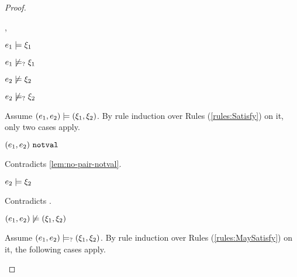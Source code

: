 \begin{proof}
\begin{byCases}
\begin{byCases}
\begin{byCases}
        \item[\csatisfy{e_1}{\xi_1},\cnotsatisfyormay{e_2}{\xi_2}]
            \begin{pfsteps*}
            \item $e_1 \models \xi_1$  
            \item $e_1 \not\models_{?} \xi_1$  
            \item $e_2 \not\models \xi_2$  
            \item $e_2 \not\models_{?} \xi_2$  
            \end{pfsteps*}
            Assume $(e_1 , e_2) \models (\xi_1 , \xi_2)$. By rule induction over Rules (\ref{rules:Satisfy}) on it, only two cases apply. 
           \begin{byCases}
            \item[\text{(\ref{rule:CSNotValPair})}]
                \begin{pfsteps*}
                \item $(e_1 , e_2) ~\mathtt{notval}$ 
                \end{pfsteps*}
                Contradicts \autoref{lem:no-pair-notval}.
            \item[\text{(\ref{rule:CSPair})}]
                \begin{pfsteps*}
                \item $e_2 \models \xi_2$ 
                \end{pfsteps*}
                Contradicts .
            \end{byCases}
            \begin{pfsteps*}
            \item $(e_1 , e_2) \not\models (\xi_1 , \xi_2)$  
            \end{pfsteps*}
            Assume $(e_1 , e_2) \models_{?} (\xi_1 , \xi_2)$. By rule induction over Rules (\ref{rules:MaySatisfy}) on it, the following cases apply.
            \begin{byCases}
            \item[\text{(\ref{rule:CMSNotVal})}]
                \begin{pfsteps*}

\end{pfsteps*}
\end{byCases}
\end{byCases}
\end{byCases}
\end{byCases}
\end{proof}

